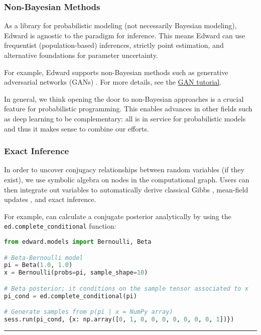 \subsubsection{Non-Bayesian Methods}

As a library for probabilistic modeling (not necessarily Bayesian
modeling), Edward is agnostic to the paradigm for inference.  This
means Edward can use frequentist (population-based) inferences,
strictly point estimation, and alternative foundations for parameter
uncertainty.

For example, Edward supports non-Bayesian methods such as generative
adversarial networks (GANs)
\citep{goodfellow2014generative}.
For more details, see the \href{/tutorials/gan}{GAN tutorial}.

In general, we think opening the door to non-Bayesian approaches is a
crucial feature for probabilistic programming. This enables advances
in other fields such as deep learning to be complementary: all is in
service for probabilistic models and thus it makes sense to combine
our efforts.

\subsubsection{Exact Inference}

In order to uncover conjugacy relationships between random variables
(if they exist), we use symbolic algebra on nodes in the computational
graph.  Users can then integrate out variables to automatically derive
classical Gibbs \citep{gelfand1990sampling},
mean-field updates \citep{bishop2006pattern}, and exact inference.

For example,  can calculate a conjugate posterior analytically by
using the \texttt{ed.complete_conditional} function:

\begin{lstlisting}[language=Python]
from edward.models import Bernoulli, Beta

# Beta-Bernoulli model
pi = Beta(1.0, 1.0)
x = Bernoulli(probs=pi, sample_shape=10)

# Beta posterior; it conditions on the sample tensor associated to x
pi_cond = ed.complete_conditional(pi)

# Generate samples from p(pi | x = NumPy array)
sess.run(pi_cond, {x: np.array([0, 1, 0, 0, 0, 0, 0, 0, 0, 1])})
\end{lstlisting}

\begin{center}\rule{3in}{0.4pt}\end{center}

